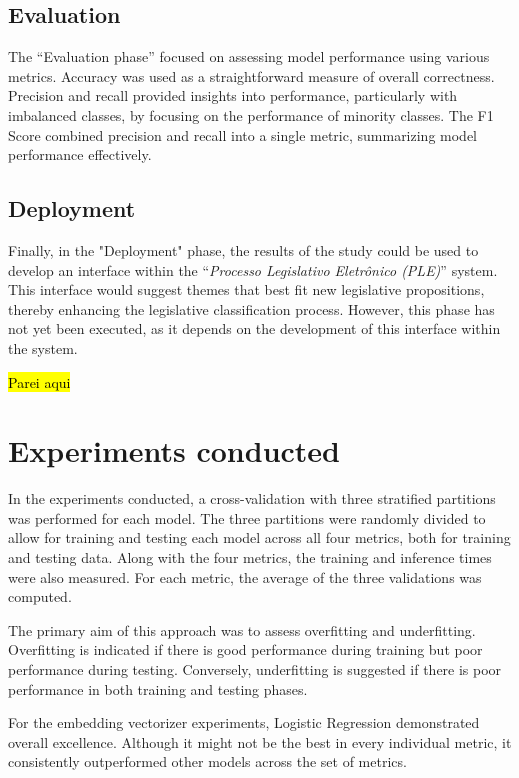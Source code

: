 \documentclass[12pt]{article}
\newcommand{\todo}[1]{\hl{#1}}
\begin{document}
\subsection{Evaluation}

The ``Evaluation phase'' focused on assessing model performance using various metrics. Accuracy was used as a straightforward measure of overall correctness. Precision and recall provided insights into performance, particularly with imbalanced classes, by focusing on the performance of minority classes. The F1 Score combined precision and recall into a single metric, summarizing model performance effectively.

\subsection{Deployment}

Finally, in the "Deployment" phase, the results of the study could be used to develop an interface within the ``\emph{Processo Legislativo Eletrônico (PLE)}'' system. This interface would suggest themes that best fit new legislative propositions, thereby enhancing the legislative classification process. However, this phase has not yet been executed, as it depends on the development of this interface within the system.


\todo{Parei aqui}

\section{Experiments conducted}

In the experiments conducted, a cross-validation with three stratified partitions was performed for each model. The three partitions were randomly divided to allow for training and testing each model across all four metrics, both for training and testing data. Along with the four metrics, the training and inference times were also measured. For each metric, the average of the three validations was computed.

The primary aim of this approach was to assess overfitting and underfitting. Overfitting is indicated if there is good performance during training but poor performance during testing. Conversely, underfitting is suggested if there is poor performance in both training and testing phases.

For the embedding vectorizer experiments, Logistic Regression demonstrated overall excellence. Although it might not be the best in every individual metric, it consistently outperformed other models across the set of metrics.
\end{document}
